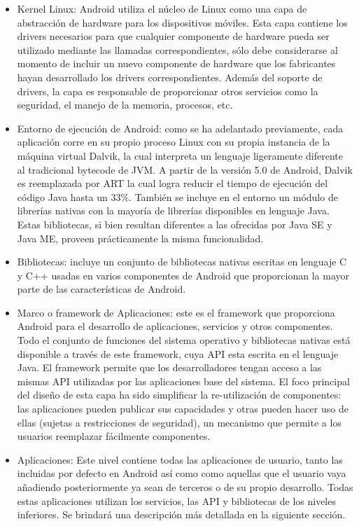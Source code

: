 \begin{itemize}
\item Kernel Linux: Android utiliza el núcleo de Linux como una capa de
abstracción de hardware para los dispositivos móviles. Esta capa contiene
los drivers necesarios para que cualquier componente de hardware pueda
ser utilizado mediante las llamadas correspondientes, sólo debe considerarse
al momento de incluir un nuevo componente de hardware que los fabricantes
hayan desarrollado los drivers correspondientes. Además del soporte
de drivers, la capa es responsable de proporcionar otros servicios
como la seguridad, el manejo de la memoria, procesos, etc. 
\item Entorno de ejecución de Android: como se ha adelantado previamente,
cada aplicación corre en su propio proceso Linux con su propia instancia
de la máquina virtual Dalvik, la cual interpreta un lenguaje ligeramente
diferente al tradicional bytecode de \ac{JVM}. A partir de la versión
5.0 de Android, Dalvik es reemplazada por \ac{ART} la cual logra
reducir el tiempo de ejecución del código Java hasta un 33\%. También
se incluye en el entorno un módulo de librerías nativas con la mayoría
de librerías disponibles en lenguaje Java. Estas bibliotecas, si bien
resultan diferentes a las ofrecidas por \ac{Java SE} y \ac{Java ME},
proveen prácticamente la misma funcionalidad. 
\item Bibliotecas: incluye un conjunto de bibliotecas nativas escritas en
lenguaje C y C++ usadas en varios componentes de Android que proporcionan
la mayor parte de las características de Android.
\item Marco o framework de Aplicaciones: este es el framework que proporciona
Android para el desarrollo de aplicaciones, servicios y otros componentes.
Todo el conjunto de funciones del sistema operativo y bibliotecas
nativas está disponible a través de este framework, cuya API esta
escrita en el lenguaje Java. El framework permite que los desarrolladores
tengan acceso a las mismas \ac{API} utilizadas por las aplicaciones
base del sistema. El foco principal del diseño de esta capa ha sido
simplificar la re-utilización de componentes: las aplicaciones pueden
publicar sus capacidades y otras pueden hacer uso de ellas (sujetas
a restricciones de seguridad), un mecanismo que permite a los usuarios
reemplazar fácilmente componentes. 
\item Aplicaciones: Este nivel contiene todas las aplicaciones de usuario,
tanto las incluidas por defecto en Android así como como aquellas
que el usuario vaya añadiendo posteriormente ya sean de terceros o
de su propio desarrollo. Todas estas aplicaciones utilizan los servicios,
las \ac{API} y bibliotecas de los niveles inferiores. Se brindará
una descripción más detallada en la siguiente sección.
\end{itemize}

